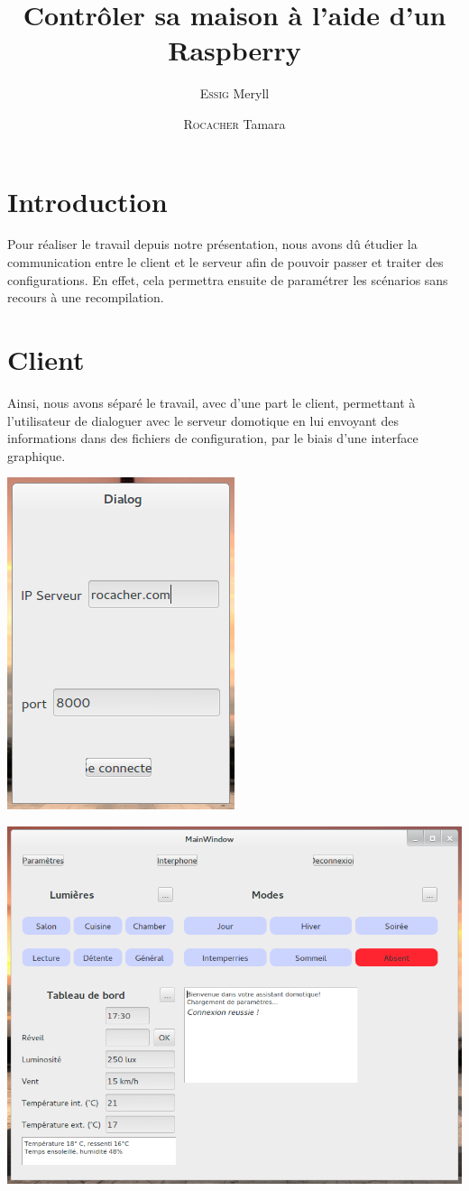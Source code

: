 \documentclass[12pt,a4paper]{article}
\title{Contrôler sa maison à l'aide d'un Raspberry}
\author{\textsc{Essig} Meryll \and \textsc{Rocacher} Tamara}
\begin{document}
\maketitle
\vfill

\section*{Introduction}
  Pour réaliser le travail depuis notre présentation, nous avons dû étudier la communication entre le client et le serveur afin de pouvoir passer et traiter des configurations. En effet, cela permettra ensuite de paramétrer les scénarios sans recours à une recompilation.
\vfill
  \section*{Client}
  Ainsi, nous avons séparé le travail, avec d'une part le client, permettant à l'utilisateur de dialoguer avec le serveur domotique en lui envoyant des informations dans des fichiers de configuration, par le biais d'une interface graphique.\\
\vfill
  \begin{center}
  \includegraphics[scale=0.45]{connexion.png}
\end{center}
\vfill
\newpage
\begin{center}
  \includegraphics[scale=0.45]{mainWin.png}
\end{center}
\end{document}
